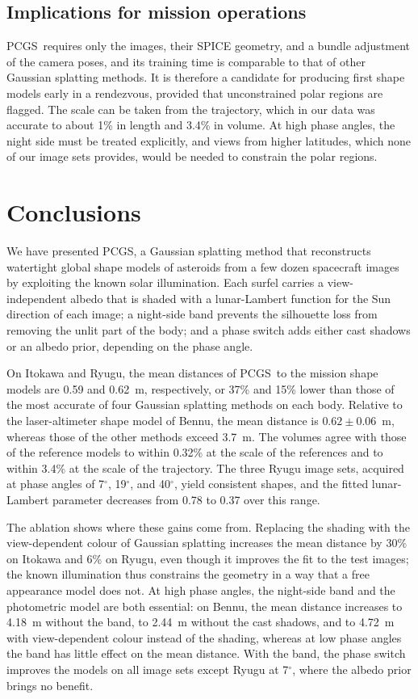 \documentclass[fleqn,usenatbib]{aa}
\newcommand{\pcgs}{PCGS}
\begin{document}
\subsection{Implications for mission operations}

\pcgs\ requires only the images, their SPICE geometry, and a bundle adjustment of the camera poses, and its training
time is comparable to that of other Gaussian splatting methods. It is therefore a candidate for producing first shape
models early in a rendezvous, provided that unconstrained polar regions are flagged. The scale can be taken from the
trajectory, which in our data was accurate to about 1\% in length and 3.4\% in volume. At high phase angles, the night
side must be treated explicitly, and views from higher latitudes, which none of our image sets provides, would be
needed to constrain the polar regions.

\section{Conclusions}
\label{sec:conclusions}

We have presented \pcgs, a Gaussian splatting method that reconstructs watertight global shape models of asteroids from
a few dozen spacecraft images by exploiting the known solar illumination. Each surfel carries a view-independent albedo
that is shaded with a lunar-Lambert function for the Sun direction of each image; a night-side band prevents the
silhouette loss from removing the unlit part of the body; and a phase switch adds either cast shadows or an albedo
prior, depending on the phase angle.

On Itokawa and Ryugu, the mean distances of \pcgs\ to the mission shape models are 0.59 and 0.62~m, respectively, or 37\% and 15\% lower than those of the most accurate of four Gaussian
splatting methods on each body. Relative to the laser-altimeter shape model of Bennu, the mean distance is $0.62\pm0.06$~m, whereas those of the other methods exceed 3.7~m. The volumes agree with
those of the reference models to within 0.32\% at the scale of the references and to within 3.4\% at the scale of the
trajectory. The three Ryugu image sets, acquired at phase angles of 7$^\circ$, 19$^\circ$, and 40$^\circ$, yield
consistent shapes, and the fitted lunar-Lambert parameter decreases from 0.78 to 0.37 over this range.

The ablation shows where these gains come from. Replacing the shading with the view-dependent colour of Gaussian
splatting increases the mean distance by 30\% on Itokawa and 6\% on Ryugu, even though it improves the fit to the test
images; the known illumination thus constrains the geometry in a way that a free appearance model does not. At high
phase angles, the night-side band and the photometric model are both essential: on Bennu, the mean distance increases
to 4.18~m without the band, to 2.44~m without the cast shadows, and to 4.72~m with view-dependent colour instead of the shading, whereas at low phase angles the band has little effect on the mean distance. With the band, the phase switch improves
the models on all image sets except Ryugu at 7$^\circ$, where the albedo prior brings no benefit.
\end{document}

